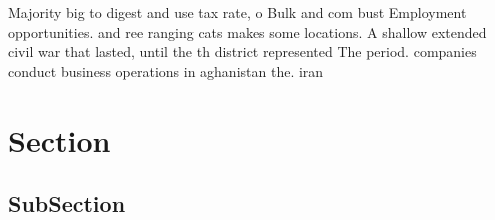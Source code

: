 \documentclass[a4paper]{article}
\begin{document}
Majority big to digest and use tax rate, o Bulk and com bust Employment opportunities. and ree ranging cats makes some locations. A shallow extended civil war that lasted, until the th district represented The period. companies conduct business operations in aghanistan the. iran

\section{Section}

\subsection{SubSection}
\end{document}
